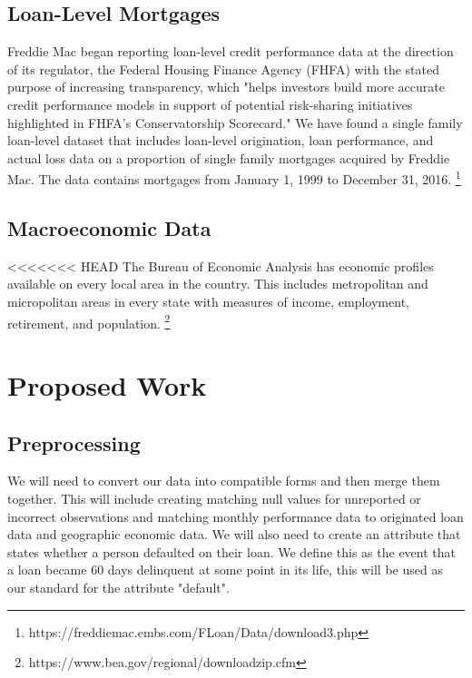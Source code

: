 \documentclass[sigconf, 11pt]{acmart}
\begin{document}
\subsection{Loan-Level Mortgages}
Freddie Mac began reporting loan-level credit performance data at the direction of its regulator, the Federal Housing Finance Agency (FHFA) with the stated purpose of increasing transparency, which "helps investors build more accurate credit performance models in support of potential risk-sharing initiatives highlighted in FHFA's Conservatorship Scorecard." We have found a single family loan-level dataset that includes loan-level origination, loan performance, and actual loss data on a proportion of single family mortgages acquired by Freddie Mac. The data contains mortgages from January 1, 1999 to December 31, 2016. \footnote{https://freddiemac.embs.com/FLoan/Data/download3.php}

\subsection{Macroeconomic Data}
<<<<<<< HEAD
The Bureau of Economic Analysis has economic profiles available on every local area in the country. This includes metropolitan and micropolitan areas in every state with measures of income, employment, retirement, and population. \footnote{https://www.bea.gov/regional/downloadzip.cfm}

\section{Proposed Work}
\subsection{Preprocessing}
We will need to convert our data into compatible forms and then merge them together. This will include creating matching null values for unreported or incorrect observations and matching monthly performance data to originated loan data and geographic economic data. We will also need to create an attribute that states whether a person defaulted on their loan. We define this as the event that a loan became 60 days delinquent at some point in its life, this will be used as our standard for the attribute "default".
\end{document}
